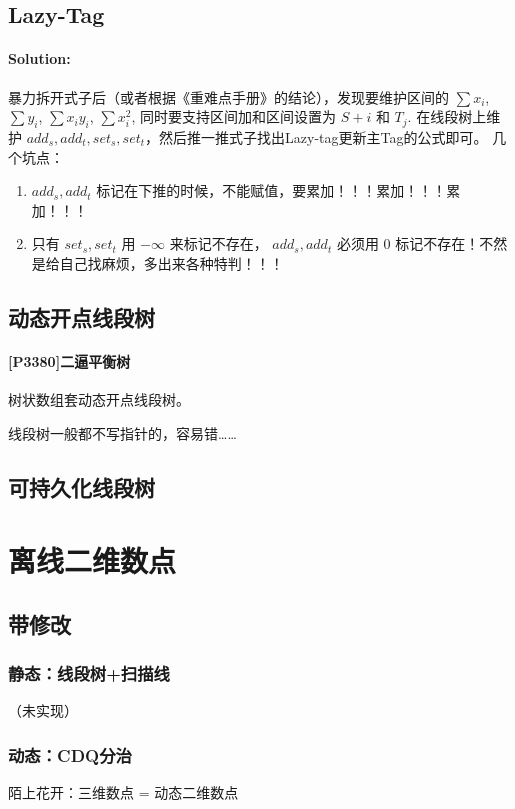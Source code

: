 \documentclass{article}
\begin{document}
		\subsection{Lazy-Tag} %
			\paragraph{Solution:}
			暴力拆开式子后（或者根据《重难点手册》的结论），发现要维护区间的 $\sum x_i$, $\sum y_i$, $\sum x_i y_i$, $\sum x_i^2$, 同时要支持区间加和区间设置为 $S+i \text{ 和 } T_j$.
			在线段树上维护 $add_s, add_t, set_s, set_t$，然后推一推式子找出Lazy-tag更新主Tag的公式即可。
			几个坑点：
			\begin{enumerate}
				\item $add_s, add_t$ 标记在下推的时候，不能赋值，要累加！！！累加！！！累加！！！
				\item 只有 $set_s, set_t$ 用 $-\infty$ 来标记不存在， $add_s, add_t$ 必须用 $0$ 标记不存在！不然是给自己找麻烦，多出来各种特判！！！
			\end{enumerate}
			
		\subsection{动态开点线段树}
			\paragraph{[P3380]二逼平衡树}
			树状数组套动态开点线段树。

			线段树一般都不写指针的，容易错……
			
		\subsection{可持久化线段树}
			
	\section{离线二维数点}
		\subsection{带修改}
			\subsubsection{静态：线段树+扫描线}
			（未实现）
			\subsubsection{动态：CDQ分治}
			陌上花开：三维数点 = 动态二维数点
			
\end{document}
